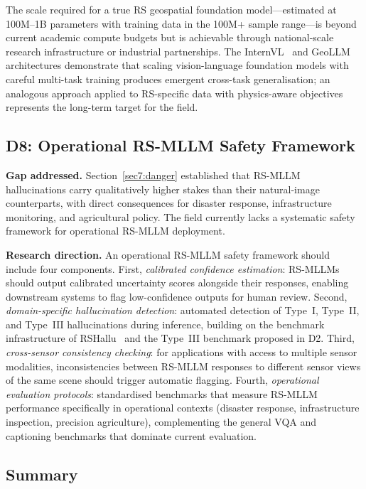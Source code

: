 The scale required for a true RS geospatial foundation model---estimated
at 100M--1B parameters with training data in the 100M+ sample
range---is beyond current academic compute budgets but is achievable
through national-scale research infrastructure or industrial partnerships.
The InternVL~\cite{internvl2024} and GeoLLM~\cite{geollm2025} architectures demonstrate that scaling
vision-language foundation models with careful multi-task training
produces emergent cross-task generalisation; an analogous approach
applied to RS-specific data with physics-aware objectives represents
the long-term target for the field.

\subsection{D8: Operational RS-MLLM Safety Framework}\label{sec9:d8}

\textbf{Gap addressed.} Section~\ref{sec7:danger} established that
RS-MLLM hallucinations carry qualitatively higher stakes than their
natural-image counterparts, with direct consequences for disaster
response, infrastructure monitoring, and agricultural policy. The
field currently lacks a systematic safety framework for operational
RS-MLLM deployment.

\textbf{Research direction.} An operational RS-MLLM safety framework
should include four components. First, \emph{calibrated confidence
estimation}: RS-MLLMs should output calibrated uncertainty scores
alongside their responses, enabling downstream systems to flag low-confidence
outputs for human review. Second, \emph{domain-specific hallucination
detection}: automated detection of Type~I, Type~II, and Type~III
hallucinations during inference, building on the benchmark infrastructure
of RSHallu~\cite{rshallu2026} and the Type~III benchmark proposed in D2.
Third, \emph{cross-sensor consistency checking}: for applications with
access to multiple sensor modalities, inconsistencies between RS-MLLM
responses to different sensor views of the same scene should trigger
automatic flagging. Fourth, \emph{operational evaluation protocols}:
standardised benchmarks that measure RS-MLLM performance specifically
in operational contexts (disaster response, infrastructure inspection,
precision agriculture), complementing the general VQA and captioning
benchmarks that dominate current evaluation.

\subsection*{Summary}

